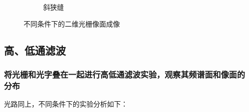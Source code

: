 \documentclass[a4paper]{article}
\begin{document}
\begin{figure}[H]
\begin{subfigure}[t]{0.4\textwidth}
        \caption{斜狭缝}
        \label{fig5-4}
    \end{subfigure}
    \captionsetup{justification=centering,subrefformat=parens,margin=2cm}
    \caption{不同条件下的二维光栅像面成像}
\end{figure}


\subsection{高、低通滤波}


\subsubsection{将光栅和光字叠在一起进行高低通滤波实验，观察其频谱面和像面的分布}

\hspace{2em} 光路同上，不同条件下的实验分析如下： \par
\end{document}
